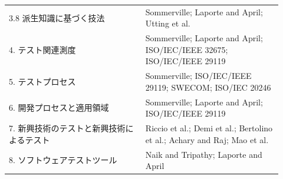 \begin{longtable}{P{0.46\linewidth}P{0.46\linewidth}}
3.8 派生知識に基づく技法 & Sommerville; Laporte and April; Utting et al. \\
4. テスト関連測度 & Sommerville; Laporte and April; ISO/IEC/IEEE 32675; ISO/IEC/IEEE 29119 \\
5. テストプロセス & Sommerville; ISO/IEC/IEEE 29119; SWECOM; ISO/IEC 20246 \\
6. 開発プロセスと適用領域 & Sommerville; Laporte and April; ISO/IEC/IEEE 29119 \\
7. 新興技術のテストと新興技術によるテスト & Riccio et al.; Demi et al.; Bertolino et al.; Achary and Raj; Mao et al. \\
8. ソフトウェアテストツール & Naik and Tripathy; Laporte and April \\
\bottomrule
\end{longtable}
